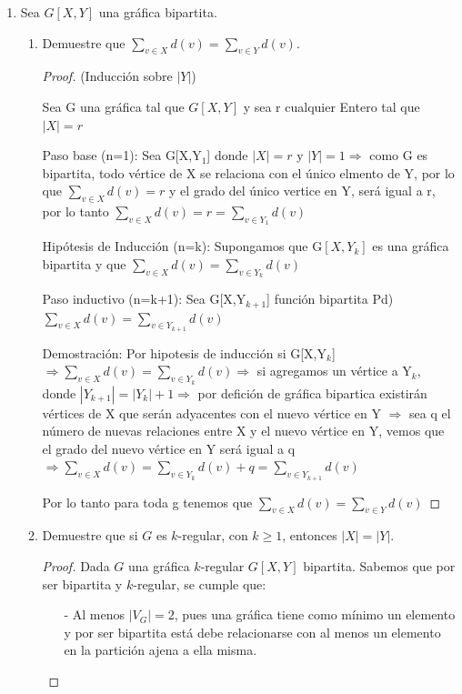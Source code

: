 \documentclass{article}
\begin{document}
\begin{enumerate}
\begin{enumerate}
\begin{proof}
      \hspace*{3cm}  $\therefore$ \ \ \ $BL_n$ es bipartita en $X$ y $Y$, \textit{i.e.} $BL_n[X,Y]$
    \end{proof}
  \end{enumerate}
  
\item Sea $G[X, Y]$ una gr\'afica bipartita.
  \begin{enumerate}

  \item Demuestre que $\sum_{v \in X} d(v) = \sum_{v \in Y} d(v)$.
  \begin{proof}
    (Inducción sobre ${|Y|}$)
    
    Sea G una gráfica tal que $G[X,Y]$ y sea r cualquier Entero tal que $|X|=r$
    
    Paso base (n=1): Sea G[X,Y$_1$] donde $|X|=r$ y $|Y|=1 \Longrightarrow $ como G es bipartita, todo vértice de X se relaciona con el único elmento de Y, por lo que $\sum_{v \in X}d(v) = r $ y el grado del único vertice en Y, será igual a r, por lo tanto $\sum_{v \in X}d(v) = r = \sum_{v \in Y_1}d(v) $
    
    Hipótesis de Inducción (n=k): Supongamos que G$[X, Y_k]$ es una gráfica bipartita y que $\sum_{v \in X}d(v) = \sum_{v \in Y_k}d(v) $ 
    
    Paso inductivo (n=k+1): Sea G[X,Y$_{k+1}$] función bipartita Pd)  
    $ \sum_{v \in X} d(v) =  \sum_{v \in Y_{k+1}}d(v) $ 
    
    Demostración: Por hipotesis de inducción si  G[X,Y$_k$] $\Longrightarrow \sum_{v \in X}d(v) = \sum_{v \in Y_k}d(v) \Longrightarrow$ si agregamos un vértice a Y$_k$, donde $|Y_{k+1}|= |Y_k| +1 \Longrightarrow$ por defición de gráfica bipartica existirán vértices de X que serán adyacentes con el nuevo vértice en Y $\Longrightarrow$ sea q el número de nuevas relaciones entre X y el nuevo vértice en Y, vemos que el grado del nuevo vértice en Y será igual a q $\Longrightarrow \sum_{v \in X} d(v) = \sum_{v \in Y_k}d(v) + q =  \sum_{v \in Y_{k+1}}d(v) $ 
    
    Por lo tanto para toda g tenemos que  $\sum_{v \in X}d(v) = \sum_{v \in Y}d(v) $ 
    \end{proof}
    
  \item Demuestre que si $G$ es $k$-regular, con $k \ge 1$, entonces
    $|X| = |Y|$.
    \begin{proof}
      Dada $G$ una gráfica $k$-regular $G[X,Y]$ bipartita. 
      Sabemos que por ser bipartita y $k$-regular, se cumple que:
      \begin{itemize}
      \item[-] Al menos $|V_G|=2$, pues una gráfica tiene como mínimo
        un elemento y por ser bipartita está debe relacionarse con al
        menos un elemento en la partición ajena a ella misma. 
        

\end{itemize}
\end{proof}
\end{enumerate}
\end{enumerate}
\end{document}
